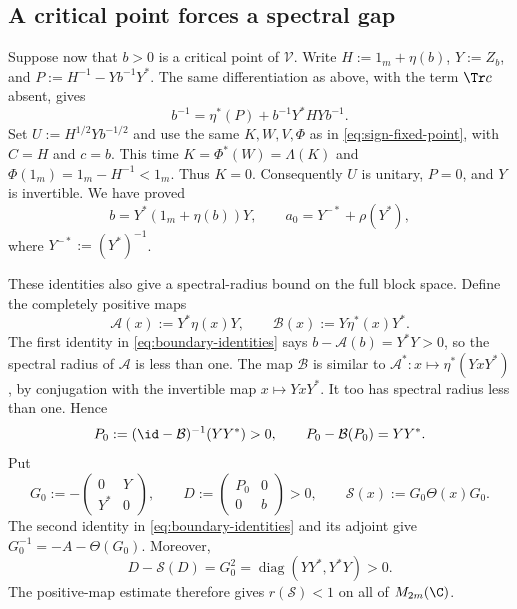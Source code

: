 \subsection{A critical point forces a spectral gap}
Suppose now that $b>0$ is a critical point of $\mathcal V$.
Write $H:=1_m+\eta(b)$, $Y:=Z_b$, and $P:=H^{-1}-Yb^{-1}Y^*$.
The same differentiation as above, with the term $\Tr c$ absent, gives
\begin{equation}\label{eq:unregularized-critical}
 b^{-1}=\eta^*(P)+b^{-1}Y^*HYb^{-1}.
\end{equation}
Set $U:=H^{1/2}Yb^{-1/2}$ and use the same $K,W,V,\Phi$ as in \eqref{eq:sign-fixed-point}, with $C=H$ and $c=b$.
This time $K=\Phi^*(W)=\Lambda(K)$ and $\Phi(1_m)=1_m-H^{-1}<1_m$.
Thus $K=0$.
Consequently $U$ is unitary, $P=0$, and $Y$ is invertible.
We have proved
\begin{equation}\label{eq:boundary-identities}
 b=Y^*(1_m+\eta(b))Y,\qquad
 a_0=Y^{-*}+\rho(Y^*),
\end{equation}
where $Y^{-*}:=(Y^*)^{-1}$.

These identities also give a spectral-radius bound on the full block space.
Define the completely positive maps
\[
 \mathcal A(x):=Y^*\eta(x)Y,\qquad
 \mathcal B(x):=Y\eta^*(x)Y^*.
\]
The first identity in \eqref{eq:boundary-identities} says $b-\mathcal A(b)=Y^*Y>0$, so the spectral radius of $\mathcal A$ is less than one.
The map $\mathcal B$ is similar to $\mathcal A^*:x\mapsto\eta^*(YxY^*)$, by conjugation with the invertible map $x\mapsto YxY^*$.
It too has spectral radius less than one.
Hence
\[
 P_0:=(\id-\mathcal B)^{-1}(YY^*)>0,
 \qquad P_0-\mathcal B(P_0)=YY^*.
\]
Put
\begin{equation}\label{eq:gap-basepoint}
 G_0:=-\begin{pmatrix}0&Y\\Y^*&0\end{pmatrix},\qquad
 D:=\begin{pmatrix}P_0&0\\0&b\end{pmatrix}>0,
 \qquad \mathcal S(x):=G_0\Theta(x)G_0.
\end{equation}
The second identity in \eqref{eq:boundary-identities} and its adjoint give $G_0^{-1}=-A-\Theta(G_0)$.
Moreover,
\begin{equation}\label{eq:strict-full-stability}
 D-\mathcal S(D)=G_0^2
       =\operatorname{diag}(YY^*,Y^*Y)>0.
\end{equation}
The positive-map estimate therefore gives $r(\mathcal S)<1$ on all of $M_{2m}(\C)$.

